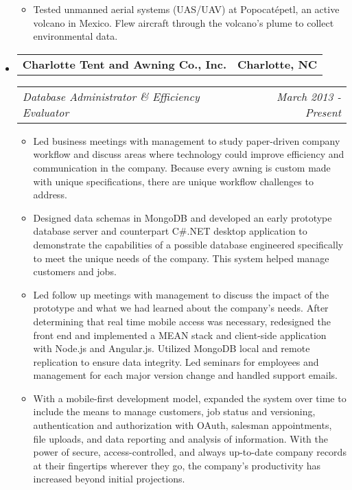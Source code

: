 \documentclass[10pt,letterpaper]{article}
\makeatletter
\newcommand{\headerrow}[2]
{\begin{tabular*}{\linewidth}{l@{\extracolsep{\fill}}r}
	#1 & #2 \\
\end{tabular*}}
\makeatother
\begin{document}
\begin{itemize}
\begin{itemize}
        \item Tested unmanned aerial systems (UAS/UAV) at Popocatépetl, an active
            volcano in Mexico. Flew aircraft through the volcano's plume to
            collect environmental data.

    \end{itemize}

	\item
	\headerrow
		{\textbf{Charlotte Tent and Awning Co., Inc.}}
		{\textbf{Charlotte, NC}}
	\headerrow
		{\emph{Database Administrator \& Efficiency Evaluator}}
        {\emph{March 2013 - Present}}
	\begin{itemize}
        \item Led business meetings with management to study paper-driven
            company workflow and discuss areas where technology could improve
            efficiency and communication in the company.  Because every awning
            is custom made with unique specifications, there are unique
            workflow challenges to address.

        \item Designed data schemas in MongoDB and developed an early prototype
            database server and counterpart C\#.NET desktop application to
            demonstrate the capabilities of a possible database engineered
            specifically to meet the unique needs of the company.  This system
            helped manage customers and jobs.

        \item Led follow up meetings with management to discuss the impact of
            the prototype and what we had learned about the company's needs.
            After determining that real time mobile access was necessary,
            redesigned the front end and implemented a MEAN stack and
            client-side application with Node.js and Angular.js.  Utilized
            MongoDB local and remote replication to ensure data integrity.  Led
            seminars for employees and management for each major version change
            and handled support emails.

        \item With a mobile-first development model, expanded the system over
            time to include the means to manage customers, job status and
            versioning, authentication and authorization with OAuth, salesman
            appointments, file uploads, and data reporting and analysis of
            information.  With the power of secure, access-controlled, and
            always up-to-date company records at their fingertips wherever they
            go, the company's productivity has increased beyond initial
            projections.
	\end{itemize}


\end{itemize}
\end{document}
